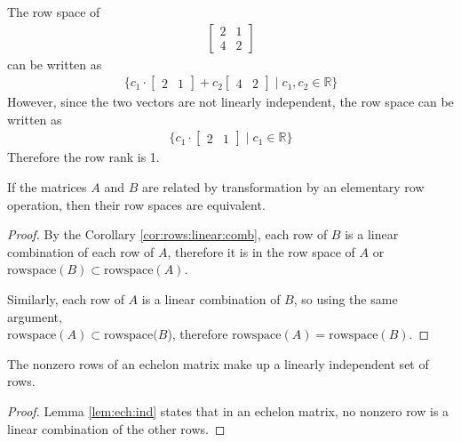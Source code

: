 \vfill

\begin{example}
The row space of
%
\begin{align*}
\begin{bmatrix}
2 & 1 \\
4 & 2
\end{bmatrix}
\end{align*}
can be written as
%
\begin{align*}
\{ c_1 \cdot \begin{bmatrix}
2 & 1
\end{bmatrix} + c_2 \begin{bmatrix}
4 & 2
\end{bmatrix} \; | \; c_1, c_2 \in \mathbb{R} \}
\end{align*}
However, since the two vectors are not linearly independent, the row space can be written as
%
\begin{align*}
\{ c_1 \cdot \begin{bmatrix}
2 & 1
\end{bmatrix}\; | \; c_1 \in \mathbb{R} \}
\end{align*}
Therefore the row rank is 1.

\end{example}


\begin{lemma}
If the matrices $A$ and $B$ are related by transformation by an elementary row operation, then their row spaces are equivalent.
\end{lemma}

\begin{proof}
By the Corollary \ref{cor:rows:linear:comb}, each row of $B$ is a linear combination of each row of $A$, therefore it is in the row space of $A$ or $\text{rowspace}(B) \subset \text{rowspace}(A)$.

Similarly, each row of $A$ is a linear combination of $B$, so using the same argument, \\ $\text{rowspace}(A) \subset \text{rowspace}(B$), therefore $\text{rowspace}(A)=\text{rowspace}(B)$.
\end{proof}


\begin{lemma}
The nonzero rows of an echelon matrix make up a linearly independent set of rows.
\end{lemma}

\begin{proof}
Lemma \ref{lem:ech:ind} states that in an echelon matrix, no nonzero row is a linear combination of the other rows.
\end{proof}

